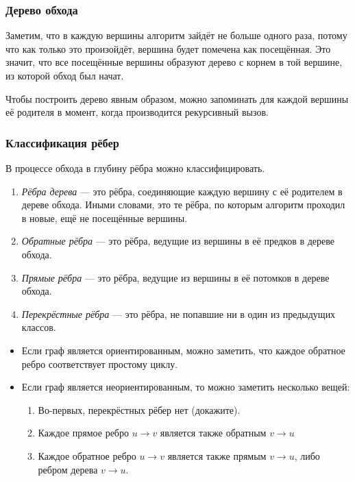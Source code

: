 \documentclass[a4paper,12pt]{article}
\begin{document}
      \subsubsection{Дерево обхода}

      Заметим, что в каждую вершины алгоритм зайдёт не больше одного
      раза, потому что как только это произойдёт, вершина будет помечена
      как посещённая. Это значит, что все посещённые вершины образуют
      дерево с корнем в той вершине, из которой обход был начат.

      Чтобы построить дерево явным образом, можно запоминать для
      каждой вершины её родителя в момент, когда производится рекурсивный
      вызов.

      \subsubsection{Классификация рёбер}

      В процессе обхода в глубину рёбра можно классифицировать.

      \begin{enumerate}
        \item \emph{Рёбра дерева} --- это рёбра, соединяющие каждую вершину
          с её родителем в дереве обхода. Иными словами, это те рёбра,
          по которым алгоритм проходил в новые, ещё не посещённые вершины.
        \item \emph{Обратные рёбра} --- это рёбра, ведущие из вершины в её
          предков в дереве обхода.
        \item \emph{Прямые рёбра} --- это рёбра, ведущие из вершины в
          её потомков в дереве обхода.
        \item \emph{Перекрёстные рёбра} --- это рёбра, не попавшие
          ни в один из предыдущих классов.
      \end{enumerate}

      \begin{itemize}
        \item Если граф является ориентированным, можно заметить,
          что каждое обратное ребро соответствует простому циклу.

        \item Если граф является неориентированным, то можно заметить
          несколько вещей:
          \begin{enumerate}
            \item Во-первых, перекрёстных рёбер нет (докажите).
            \item Каждое прямое ребро $u \to v$ является также обратным
              $v \to u$
            \item Каждое обратное ребро $u \to v$ является также
              прямым $v \to u$, либо ребром дерева $v \to u$.
          \end{enumerate}
      \end{itemize}
\end{document}
